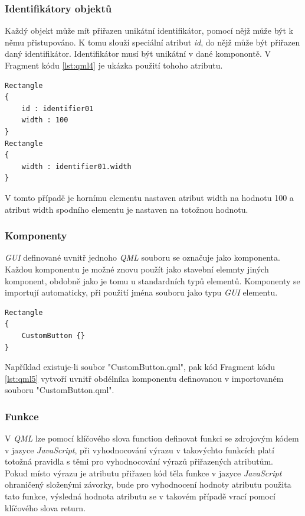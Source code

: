 \documentclass[11pt,twoside,a4paper]{book}
\begin{document}
\subsubsection{Identifikátory objektů}
Každý objekt může mít přiřazen unikátní identifikátor, pomocí nějž může být k němu přistupováno.  K tomu slouží speciální atribut \textit{id}, do nějž může být přiřazen daný identifikátor. Identifikátor musí být unikátní v dané komponontě. V Fragment kódu \ref{lst:qml4} je ukázka použití tohoho atributu.
\begin{lstlisting}[frame=single,caption=Ukázka použití atributu id.,label=lst:qml4]
Rectangle
{
	id : identifier01
	width : 100
}
Rectangle
{
	width : identifier01.width
}
\end{lstlisting}
V tomto případě je hornímu elementu nastaven atribut width na hodnotu 100 a atribut width spodního elementu je nastaven na totožnou hodnotu.

\subsubsection{Komponenty}
\textit{GUI} definované uvnitř jednoho \textit{QML} souboru se označuje jako komponenta. Každou komponentu je možné znovu použít jako stavební elemnty jiných komponent, obdobně jako je tomu u standardních typů elementů. Komponenty se importují automaticky, při použití jména souboru jako typu \textit{GUI} elementu.

\begin{lstlisting}[frame=single,caption=Ukázka použití komponenty z jiného souboru.,label=lst:qml5]
Rectangle
{
	CustomButton {}
}
\end{lstlisting}
Například existuje-li soubor "CustomButton.qml", pak kód Fragment kódu \ref{lst:qml5} vytvoří uvnitř obdélníka komponentu definovanou v importovaném souboru "CustomButton.qml".

\subsubsection{Funkce}

V \textit{QML} lze pomocí klíčového slova function definovat funkci se zdrojovým kódem v jazyce \textit{JavaScript}, při vyhodnocování výrazu v takovýchto funkcích platí totožná pravidla s těmi pro vyhodnocování výrazů přiřazených atributům.\\
Pokud místo výrazu je atributu přiřazen kód těla funkce v jazyce \textit{JavaScript} ohraničený složenými závorky, bude pro vyhodnocení hodnoty atributu použita tato funkce, výsledná hodnota atributu se v takovém případě vrací pomocí klíčového slova return.
\end{document}
